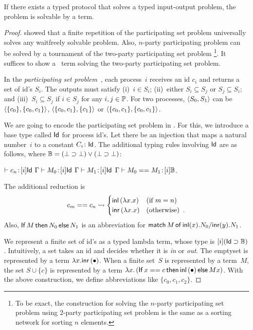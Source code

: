 \begin{theorem}
If there exists a typed protocol that solves a typed input-output
 problem,
the problem is solvable by a term.
\end{theorem}

\begin{proof}
\citet{herlihy1999topological} showed that a finite repetition
 of the participating set
 problem universally solves any waitfreely solvable problem.
 Also, $n$-party participating problem can be solved by a tournament of
 the two-party participating set problem%
 \footnote{To be exact, the construction for solving the $n$-party
 participating set problem using 2-party participating set problem
 is the same as a sorting network  for sorting $n$
 elements.}.
 It suffices to show a \lgd\, term solving the two-party participating
 set problem.

In the \textit{participating set problem}~\cite{borowsky},
each process~$i$ receives an id $c_i$ and
returns a set of id's $S_i$.
The outputs must satisfy (i)~$i\in S_i$; (ii)~either $S_i\subseteq S_j$
or $S_j\subseteq S_i$; and (iii)~$S_i\subseteq S_j$  if $i\in S_j$ for any
$i,j\in\mathbb{P}$.
For two processes,
$\langle{S_0, S_1}\rangle$ can be $\langle{\{c_0\}, \{c_0, c_1\}}\rangle$, $\langle{\{c_0, c_1\}, \{c_1\}}\rangle$
or
$\langle{\{c_0, c_1\}, \{c_0, c_1\}}\rangle$.

We are going to encode the participating set problem in \lgd.
For this, we introduce a base type called $\mathsf{Id}$ for process id's.
Let there be an injection that maps a natural number~$i$ to a constant
$C_i\colon\mathsf{Id}$.
The additional typing rules involving $\mathsf{Id}$ are as follows, where $\mathbb{B} = (\bot\supset\bot)\vee(\bot\supset\bot)$:
\begin{center}
 \UnaryRule{}{}
 {$\vdash {c_n} \mathord{\colon\kern -2pt}{[i]\mathsf{Id}}$}
 \hfill
 \BinaryRule
 {$\Gamma\vdash {M_0} \mathord{\colon\kern -2pt}{[}i]\mathsf{Id}$}
 {$\Gamma\vdash {M_1} \mathord{\colon\kern -2pt}{[}i]\mathsf{Id}$}
 {}
 {$\Gamma \vdash {{M_0} == {M_1}} \mathord{\colon\kern -2pt}{[i]\mathbb{B}}$}\enspace.
\end{center}
The additional reduction is
\[
 c_m == c_n \rightsquigarrow
\begin{cases}
 \mathsf{inl}\left({\lambda x.x}\right)& (\text{if } m = n)\\
 \mathsf{inr}\left({\lambda x.x}\right)& (\text{otherwise})\enspace.
\end{cases}
\]
Also,
${\mathsf{If}\, {M}\, \mathsf{then}\, {N_0}\, \mathsf{else}\, {N_1}}$
is an abbreviation for
${\mathsf{match}\,{M}\,\mathsf{of}\, \mathsf{inl}({x}). {N_0}/ \mathsf{inr}({y}). {N_1}}$.

We represent a finite set of id's as a
typed lambda term, whose type is $[i](\mathsf{Id}\supset \mathbb{B})$.  Intuitively, a
set takes an id and decides whether it is \textit{in} or \textit{out}.
The emptyset is represented by a term $\lambda x. \mathsf{inr}\left({\bullet}\right)$.
When a finite set~$S$ is represented by a term~$M$,
the set $S \cup \{c\}$ is represented by a term
$\lambda x.\left(\mathsf{If}\, {x==c}\, \mathsf{then}\, {\mathsf{inl}\left({\bullet}\right)}\, \mathsf{else}\, {Mx}\right)$.
With the above construction, we define abbreviations
like $\{c_0, c_1, c_2\}$.


\end{proof}
